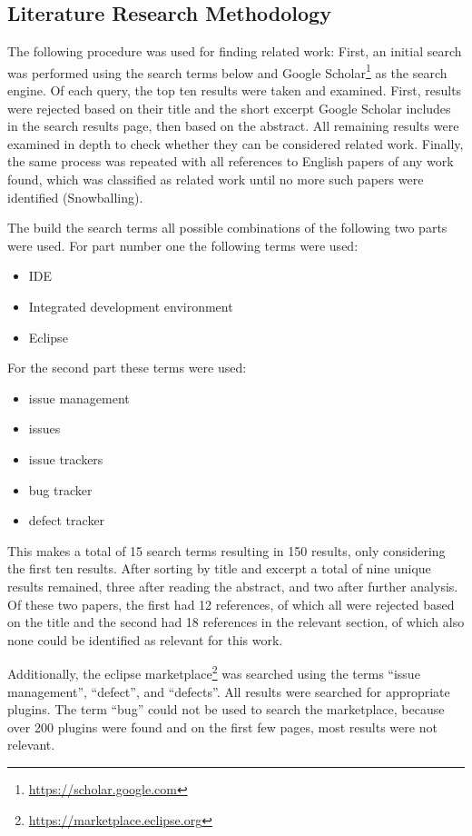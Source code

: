 \subsection{Literature Research Methodology} 
\label{ssec:ch2:ss2.1}
The following procedure was used for finding related work:
First, an initial search was performed using the search terms below and Google Scholar\footnote{\url{https://scholar.google.com}} as the search engine.
Of each query, the top ten results were taken and examined.
First, results were rejected based on their title and the short excerpt Google Scholar includes in the search results page, 
then based on the abstract.
All remaining results were examined in depth to check whether they can be considered related work.
Finally, the same process was repeated with all references to English papers of any work found, 
which was classified as related work until no more such papers were identified (Snowballing).

The build the search terms all possible combinations of the following two parts were used.
For part number one the following terms were used:
\begin{itemize}
	\item IDE
	\item Integrated development environment
	\item Eclipse
\end{itemize}

For the second part these terms were used:

\begin{itemize}
	\item issue management
	\item issues
	\item issue trackers
	\item bug tracker
	\item defect tracker
\end{itemize}

This makes a total of 15 search terms resulting in 150 results, only considering the first ten results.
After sorting by title and excerpt a total of nine unique results remained, three after reading the abstract, and two after further analysis.
Of these two papers, the first had 12 references, of which all were rejected based on the title and the second had 18 references in the relevant section, of which also none could be identified as relevant for this work.

Additionally, the eclipse marketplace\footnote{\url{https://marketplace.eclipse.org}} was searched using the terms ``issue management'', ``defect'', and ``defects''. 
All results were searched for appropriate plugins.
The term ``bug'' could not be used to search the marketplace, because over 200 plugins were found and on the first few pages, most results were not relevant.

